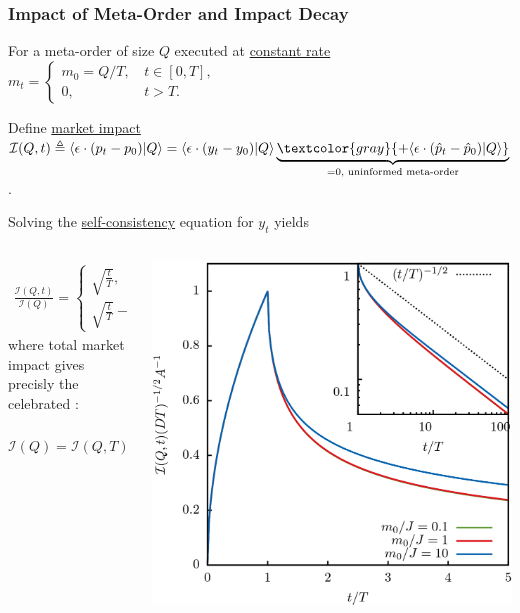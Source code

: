 \documentclass{beamer}
\begin{document}
\begin{frame}
\frametitle{Impact of Meta-Order and Impact Decay}
{
\footnotesize{
For a meta-order of size $Q$ executed at \underline{constant rate}
$
m_t = \begin{cases}
 m_0 = Q/T, \, &t\in[0,T],\\
 0, \, &t>T.
\end{cases}
$

Define \underline{market impact} $\mathcal{I}(Q,t) \triangleq \langle \epsilon\cdot(p_t - p_0) |Q\rangle
=  \langle \epsilon\cdot(y_t - y_0) |Q\rangle \underbrace{\textcolor{gray}{+ \langle \epsilon\cdot(\hat{p}_t - \hat{p}_0) |Q\rangle}}_{\text{=0, uninformed meta-order}}$.

Solving the \underline{self-consistency} equation for $y_t$ yields
\begin{columns}
\begin{column}{0.55\textwidth}
\begin{align*}
\frac{\mathcal{I}(Q,t)}{\mathcal{I}(Q)} = 
\begin{cases}
\sqrt{\frac{t}{T}}, \, &t\in[0,T],\\
\sqrt{\frac{t}{T}} - \sqrt{\frac{t-T}{T}}, \,  &t>T,
\end{cases}
\end{align*}
where total market impact gives precisly the celebrated \textit{\color{blue}{square-root impact law}}:
$$
\mathcal{I}(Q) = \mathcal{I}(Q,T) \approx \begin{cases}
\sqrt{\frac{m_0}{\pi J}}\times\sqrt{\frac{Q}{\mathcal{L}}}, \, & m_0 \ll J,\\
\sqrt{2}\times \sqrt{\frac{Q}{\mathcal{L}}}, \, & m_0 \gg J.
\end{cases}
$$
\end{column}
\begin{column}{0.45\textwidth}  %
    \begin{center}
     \includegraphics[width=\textwidth,height=.5\textheight]{impact}

\end{center}
\end{column}
\end{columns}}}
\end{frame}
\end{document}
